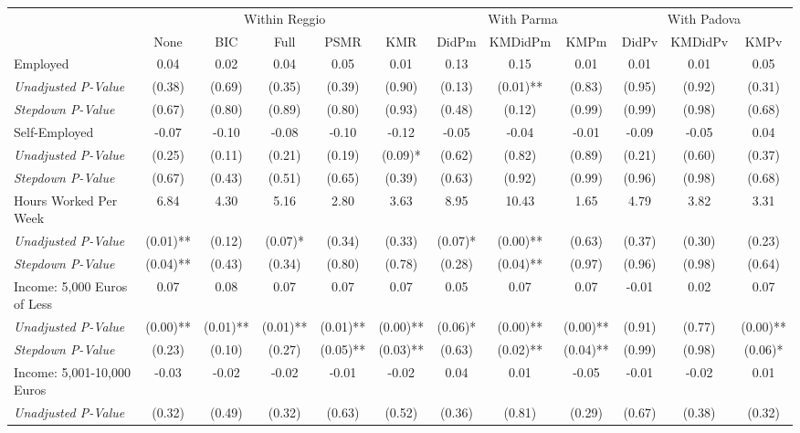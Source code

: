 \begin{tabular}{l c c c c c c c c c c c}
\toprule
& \multicolumn{5}{c}{Within Reggio} & \multicolumn{3}{c}{With Parma} & \multicolumn{3}{c}{With Padova} \\\cmidrule(lr){2-6} \cmidrule(lr){7-9} \cmidrule(lr){10-12}
 & None & BIC & Full & PSMR & KMR & DidPm & KMDidPm & KMPm & DidPv & KMDidPv & KMPv \\
\midrule
Employed & 0.04 & 0.02 & 0.04 & 0.05 & 0.01 & 0.13 & 0.15 & 0.01 & 0.01 & 0.01 & 0.05 \\
\quad \textit{Unadjusted P-Value} & (0.38) & (0.69) & (0.35) & (0.39) & (0.90) & (0.13) & (0.01)** & (0.83) & (0.95) & (0.92) & (0.31) \\
\quad \textit{Stepdown P-Value} & (0.67) & (0.80) & (0.89) & (0.80) & (0.93) & (0.48) & (0.12) & (0.99) & (0.99) & (0.98) & (0.68) \\
Self-Employed & -0.07 & -0.10 & -0.08 & -0.10 & -0.12 & -0.05 & -0.04 & -0.01 & -0.09 & -0.05 & 0.04 \\
\quad \textit{Unadjusted P-Value} & (0.25) & (0.11) & (0.21) & (0.19) & (0.09)* & (0.62) & (0.82) & (0.89) & (0.21) & (0.60) & (0.37) \\
\quad \textit{Stepdown P-Value} & (0.67) & (0.43) & (0.51) & (0.65) & (0.39) & (0.63) & (0.92) & (0.99) & (0.96) & (0.98) & (0.68) \\
Hours Worked Per Week & 6.84 & 4.30 & 5.16 & 2.80 & 3.63 & 8.95 & 10.43 & 1.65 & 4.79 & 3.82 & 3.31 \\
\quad \textit{Unadjusted P-Value} & (0.01)** & (0.12) & (0.07)* & (0.34) & (0.33) & (0.07)* & (0.00)** & (0.63) & (0.37) & (0.30) & (0.23) \\
\quad \textit{Stepdown P-Value} & (0.04)** & (0.43) & (0.34) & (0.80) & (0.78) & (0.28) & (0.04)** & (0.97) & (0.96) & (0.98) & (0.64) \\
Income: 5,000 Euros of Less & 0.07 & 0.08 & 0.07 & 0.07 & 0.07 & 0.05 & 0.07 & 0.07 & -0.01 & 0.02 & 0.07 \\
\quad \textit{Unadjusted P-Value} & (0.00)** & (0.01)** & (0.01)** & (0.01)** & (0.00)** & (0.06)* & (0.00)** & (0.00)** & (0.91) & (0.77) & (0.00)** \\
\quad \textit{Stepdown P-Value} & (0.23) & (0.10) & (0.27) & (0.05)** & (0.03)** & (0.63) & (0.02)** & (0.04)** & (0.99) & (0.98) & (0.06)* \\
Income: 5,001-10,000 Euros & -0.03 & -0.02 & -0.02 & -0.01 & -0.02 & 0.04 & 0.01 & -0.05 & -0.01 & -0.02 & 0.01 \\
\quad \textit{Unadjusted P-Value} & (0.32) & (0.49) & (0.32) & (0.63) & (0.52) & (0.36) & (0.81) & (0.29) & (0.67) & (0.38) & (0.32) \\

\end{tabular}
